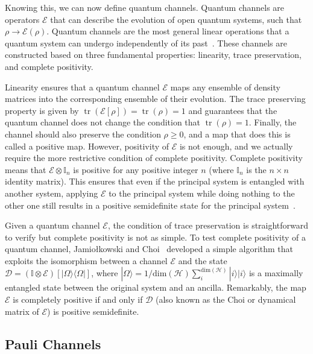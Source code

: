 \documentclass[10pt,letterpaper]{article} %
\DeclareMathOperator{\tr}{tr}
\begin{document}
Knowing this, we can now define quantum channels.
Quantum channels are operators $\mathcal{E}$ that
can describe the evolution of open quantum systems, such that $\rho \rightarrow \mathcal{E}(\rho)$.
Quantum channels are the most general linear operations
that a quantum system can undergo independently of its
past~\cite{zimansbook,cirac}.
These channels are constructed based on three fundamental properties: 
linearity, trace preservation, and complete positivity.

Linearity ensures that a quantum channel $\mathcal{E}$ maps any ensemble
of density matrices into the corresponding ensemble of their evolution.
The trace preserving property is given by $\tr (\mathcal{E}[\rho]) = \tr (\rho) =
1$ and guarantees that the quantum channel does not change the condition that $\tr(\rho) = 1$.
Finally, the channel should also preserve
the condition $\rho \geq 0$, and a map that does this is called a positive map.
However, positivity of $\mathcal{E}$ is not enough, 
and we actually require the more restrictive condition of complete positivity.
Complete positivity means that
$\mathcal{E} \otimes \mathbb{I}_n$ is positive for
any positive integer $n$ 
(where $\mathbb{I}_n$ is the $n\times n$ identity matrix).
This ensures that even if the principal system is entangled with another system,
applying $\mathcal{E}$ to the principal system while doing nothing to the
 other one still results in  a positive semidefinite state for the principal system~\cite{chuangbook}. 

Given a quantum channel $\mathcal{E}$, 
the condition of trace preservation is straightforward to verify but complete positivity is not as simple.
To test complete positivity of a quantum channel, 
Jamiołkowski and Choi~\cite{choi,jamil} developed a simple algorithm that exploits the
isomorphism between a channel $\mathcal{E}$ and the state $\mathcal{D} =
(\mathbb{I} \otimes \mathcal{E}) [|\Omega \rangle \langle  \Omega|]$, where
$|\Omega\rangle = 1/\text{dim}(\mathcal{H}) \sum_{i}^{\text{dim}(\mathcal{H})} |i \rangle |i \rangle$ is a maximally entangled state between the original system and
an ancilla.  Remarkably, the map $\mathcal{E}$
is completely positive if and only if $\mathcal{D}$ (also known as the Choi or
dynamical matrix of $\mathcal{E}$) is positive semidefinite.

\subsection*{Pauli Channels} \label{subsec: Pauli Channels} %
\end{document}
